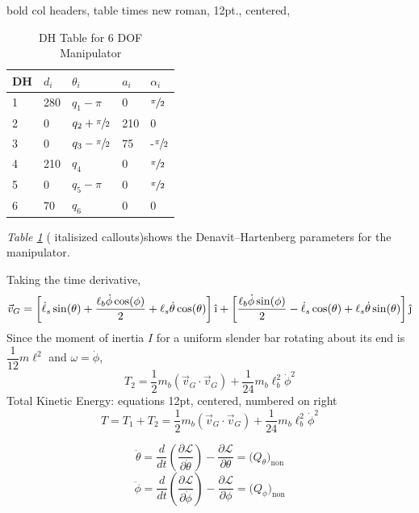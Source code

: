 \documentclass[12pt]{report}
\newcommand{\Lag}{\mathcal{L}} %
\begin{document}
\begin{table}[htp]
  \center
  \caption{DH Table for 6 DOF Manipulator}
  \label{table:dh}
  \color{red} bold col headers, table times new roman, 12pt., centered, \color{black} \\
  \begin{tabular}{C{1cm}|C{1cm}C{2cm}C{1cm}C{1cm}}
    \textbf{DH} & $d_i$ & $\theta_i$ & $a_i$ & $\alpha_i$ \\  & 280 & $q_1 - \pi$ & 0 & $\sfrac{\pi}{2}$ \\
    2 & 0 & $q_2 + \sfrac{\pi}{2}$ & 210 & 0 \\
    3 & 0 & $q_3 - \sfrac{\pi}{2}$ & 75 & -$\sfrac{\pi}{2}$ \\
    4 & 210 & $q_4$ & 0 & $\sfrac{\pi}{2}$ \\
    5 & 0 & $q_5 - \pi$ & 0 & $\sfrac{\pi}{2}$ \\
    6 & 70 & $q_6$ & 0 & 0 \\
  \end{tabular}
\end{table}

\emph{Table \ref{table:dh}} (\color{red} italisized callouts\color{black})shows the Denavit–Hartenberg parameters for the manipulator. \blindtext

Taking the time derivative,
$$
\vec{v}_G =
\left[\dot{\ell}_s\sin(\theta) + \frac{\ell_b\dot{\phi}\cos(\phi)}{2} +
\ell_s\dot{\theta}\cos(\theta)\right]\hat{\textrm{\i}} +
\left[\frac{\ell_b\dot{\phi}\sin(\phi)}{2} -
\dot{\ell}_s\cos(\theta) + \ell_s\dot{\theta}\sin(\theta)\right]\hat{\textrm{\j}}
$$
Since the moment of inertia $I$ for a uniform slender bar rotating about its end is
$\dfrac{1}{12}m\ell^2$ and $\omega = \dot{\phi}$,
$$T_2 = \frac{1}{2}m_{b}(\vec{v}_G \cdot \vec{v}_G) + \frac{1}{24}m_{b}\ell_b^2\dot{\phi}^2$$
Total Kinetic Energy: \hfill \color{red} equations 12pt, centered, numbered on right\color{black} \hfill\null
\begin{equation}
T = T_1 + T_2 = \frac{1}{2}m_{b}(\vec{v}_G \cdot \vec{v}_G) + \frac{1}{24}m_{b}\ell_b^2\dot{\phi}^2
\end{equation}

\begin{equation}
\ddot{\theta} = \frac{d}{dt}\left(\frac{\partial\Lag}{\partial\dot{\theta}}\right) -
\frac{\partial\Lag}{\partial\theta} = \big(Q_{\theta}\big)_{\text{non}}
\label{eq:lagtheta}
\end{equation}
\begin{equation}
\ddot{\phi} = \frac{d}{dt}\left(\frac{\partial\Lag}{\partial\dot{\phi}}\right) -
\frac{\partial\Lag}{\partial\phi} = \big(Q_{\phi}\big)_{\text{non}}
\label{eq:lagphi}
\end{equation}
\end{document}
